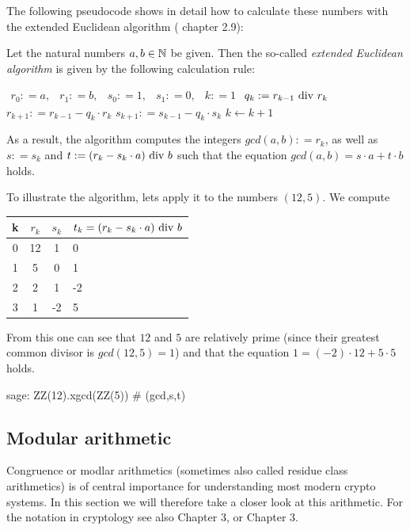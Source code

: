 The following pseudocode shows in detail how to calculate these numbers with the extended Euclidean algorithm (\cite{JB} chapter 2.9):




\begin{definition}
\label{theorem: ext_Euclid}
Let the natural numbers $ a, b \in \mathbb{N} $ be given. Then the so-called \textit{extended Euclidean algorithm} is given by the following calculation rule:
\begin{algorithmic}
\State $ \begin{array}{ccccc}
r_0: = a, & r_1: = b, & s_0: = 1, & s_1: = 0, & k: = 1
\end{array} $
\State $ q_k: = r_{k-1} \text{ div } r_k $
\State $ r_{k + 1}: = r_{k-1} -q_k \cdot r_k $
\State $ s_{k + 1}: = s_{k-1} -q_k \cdot s_k $
\State $ k \gets k + 1 $
\EndWhile
\end{algorithmic}
As a result, the algorithm computes the integers $ gcd (a, b): = r_k $, as well as $ s: = s_k $ and $ t: = (r_k-s_k \cdot a) \text{ div } b $ such that the equation
$ gcd (a, b) = s \cdot a + t \cdot b $ holds.
\end{definition}
\begin{example} To illustrate the algorithm, lets apply it to the numbers $ (12,5) $. We compute
\begin{center}
  \begin{tabular}{c | c c l}
    k & $ r_k $ & $ s_k $ & $ t_k = (r_k-s_k \cdot a) \text{ div } b $ \\\hline
    0 & 12 & 1 & 0 \\
    1 & 5 & 0 & 1 \\
    2 & 2 & 1 & -2 \\
    3 & 1 & -2 & 5 \\
  \end{tabular}
\end{center}
From this one can see that $ 12 $ and $ 5 $ are relatively prime (since their greatest common divisor is $ gcd (12, 5) = 1 $) and that the equation $ 1 = (-2) \cdot 12 + 5 \cdot 5 $ holds.
\end{example}

\begin{sagecommandline}
sage: ZZ(12).xgcd(ZZ(5)) # (gcd,s,t)
\end{sagecommandline}

\subsection{Modular arithmetic}
Congruence or modlar arithmetics (sometimes also called residue class arithmetics) is of central importance for understanding most modern crypto systems. In this section we will therefore take a closer look at this arithmetic. For the notation in cryptology see also \cite{JB} Chapter 3, or \cite{AL} Chapter 3.

